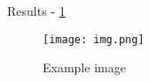 Results - \ref{fig: a black image}

\begin{figure}[h]
    \centering
    \texttt{[image: img.png]}
    \caption{Example image}
    \label{fig: a black image}
\end{figure}
